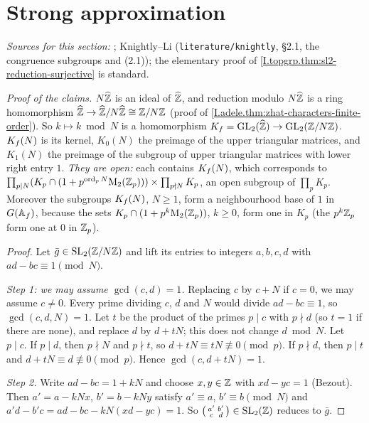 \section{Strong approximation}\label{sec:topgrp-strong-approx}

\noindent\emph{Sources for this section:} \cite[§4.11]{GH}; Knightly--Li (\texttt{literature/knightly}, §2.1, the
congruence subgroups and (2.1)); the elementary proof of \cref{I.topgrp.thm:sl2-reduction-surjective} is standard.

\begin{definition}
\end{definition}
\noindent\emph{Proof of the claims.} $N\widehat{\mathbb{Z}}$ is an ideal of $\widehat{\mathbb{Z}}$, and reduction modulo $N\widehat{\mathbb{Z}}$ is a ring
homomorphism $\widehat{\mathbb{Z}}\to\widehat{\mathbb{Z}}/N\widehat{\mathbb{Z}}\cong\mathbb{Z}/N\mathbb{Z}$ (proof of \cref{I.adele.thm:zhat-characters-finite-order}). So
$k\mapsto k\bmod N$ is a homomorphism $K_f=\mathrm{GL}_2(\widehat{\mathbb{Z}})\to\mathrm{GL}_2(\mathbb{Z}/N\mathbb{Z})$. $K_f(N)$ is its kernel, $K_0(N)$ the preimage
of the upper triangular matrices, and $K_1(N)$ the preimage of the subgroup of upper triangular matrices with lower
right entry $1$. \emph{They are open:} each contains $K_f(N)$, which corresponds to
$\prod_{p\mid N}(K_p\cap(1+p^{\operatorname{ord}_pN}\mathrm{M}_2(\mathbb{Z}_p)))\times\prod_{p\nmid N}K_p$, an open subgroup of
$\prod_pK_p$. Moreover the subgroups $K_f(N)$, $N\ge1$, form a neighbourhood base of $1$ in $G(\mathbb{A}_f)$, because the sets
$K_p\cap(1+p^k\mathrm{M}_2(\mathbb{Z}_p))$, $k\ge0$, form one in $K_p$ (the $p^k\mathbb{Z}_p$ form one at $0$ in $\mathbb{Z}_p$).

\begin{theorem}[$\SL_2(\Z)\to\SL_2(\Z/N)$ is surjective]
\end{theorem}
\begin{proof}
Let $\bar g\in\mathrm{SL}_2(\mathbb{Z}/N\mathbb{Z})$ and lift its entries to integers $a,b,c,d$ with $ad-bc\equiv1\pmod N$.

\emph{Step 1: we may assume $\gcd(c,d)=1$.} Replacing $c$ by $c+N$ if $c=0$, we may assume $c\neq0$. Every prime
dividing $c$, $d$ and $N$ would divide $ad-bc\equiv1$, so $\gcd(c,d,N)=1$. Let $t$ be the product of the primes $p\mid c$
with $p\nmid d$ (so $t=1$ if there are none), and replace $d$ by $d+tN$; this does not change $d\bmod N$. Let $p\mid c$.
If $p\mid d$, then $p\nmid N$ and $p\nmid t$, so $d+tN\equiv tN\not\equiv0\pmod p$. If $p\nmid d$, then $p\mid t$ and
$d+tN\equiv d\not\equiv0\pmod p$. Hence $\gcd(c,d+tN)=1$.

\emph{Step 2.} Write $ad-bc=1+kN$ and choose $x,y\in\mathbb{Z}$ with $xd-yc=1$ (Bezout). Then $a'=a-kNx$, $b'=b-kNy$ satisfy
$a'\equiv a$, $b'\equiv b\pmod N$ and $a'd-b'c=ad-bc-kN(xd-yc)=1$. So
$\begin{psmallmatrix}a'&b'\\c&d\end{psmallmatrix}\in\mathrm{SL}_2(\mathbb{Z})$ reduces to $\bar g$.
\end{proof}

